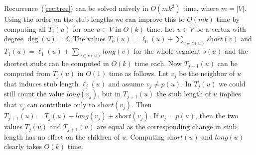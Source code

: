 \documentclass[a4paper,english,numberwithinsect]{eurocg18}
\newcommand{\maxsped}{\ensuremath{\textsc{MaxSPED}}\xspace}
\newcommand{\sollong}{\ensuremath{\textit{long}}\xspace}
\newcommand{\solshort}{\ensuremath{\textit{short}}\xspace}
\begin{document}

Recurrence~(\ref{rec:tree}) can be solved naively in $ O(mk^2) $ time, where $m = |V|$. 
Using the order on the stub lengths  we can improve this to $ O(mk) $ time by computing all $ T_i(u) $ for one $ u \in V $ in $O(k)$ time.
Let $u \in V$ be a vertex with degree $\deg(u) = \delta$. 
The values $T_0(u) = \ell_0(u) + \sum_{v\in c(u)} \solshort(v)$ and $T_1(u) = \ell_1(u) + \sum_{v\in c(u)} \sollong(v)$ for the whole segment $s(u)$ and the shortest stubs can be computed in $O(k)$ time each.
Now $T_{j+1}(u)$ can be computed from $T_j(u)$ in $O(1)$ time as follows.
Let $v_j $ be the neighbor of $u$ that induces stub length $\ell_j(u)$ and assume $v_j \ne p(u)$.
In $T_j(u)$ we could still count the value $\sollong(v_j)$, but in $T_{j+1}(u)$ the stub length of $u$ implies that $v_j$ can contribute only to $\solshort(v_j)$. 
Then $T_{j+1}(u) = T_j(u) - \sollong(v_j) + \solshort(v_j)$.
If $v_j=p(u)$, then the two values $T_j(u)$ and $T_{j+1}(u)$ are equal as the corresponding change in stub length has no effect on the children of $u$.
Computing $\solshort(u)$ and $\sollong(u)$ clearly takes $O(k)$ time.
\end{document}
